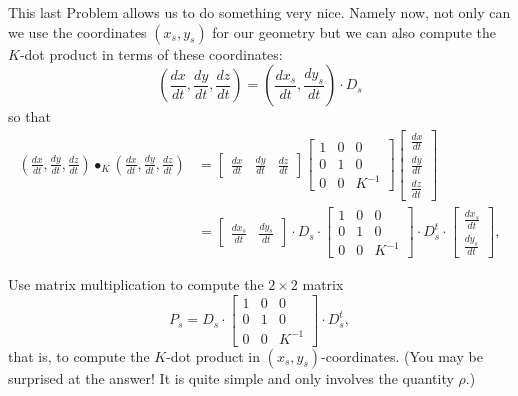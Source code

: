 \documentclass{ximera}
\begin{document}
This last Problem allows us to do something very nice. Namely now, not
only can we use the coordinates $\left( x_{s},y_{s}\right) $ for our
geometry but we can also compute the $K$-dot product in terms of these
coordinates:%
\[
\left(  \frac{dx}{dt},\frac{dy}{dt},\frac{dz}{dt}\right)  =\left(
\frac{dx_{s}}{dt},\frac{dy_{s}}{dt}\right)  \cdot D_{s}%
\]
so that%
\begin{align*}
\left(  \frac{dx}{dt},\frac{dy}{dt},\frac{dz}{dt}\right)  \bullet_{K}\left(
\frac{dx}{dt},\frac{dy}{dt},\frac{dz}{dt}\right)   &=
\begin{bmatrix}
\frac{dx}{dt} & \frac{dy}{dt} & \frac{dz}{dt}%
\end{bmatrix}
\begin{bmatrix}
1 & 0 & 0\\
0 & 1 & 0\\
0 & 0 & K^{-1}%
\end{bmatrix}
\begin{bmatrix}
\frac{dx}{dt}\\
\frac{dy}{dt}\\
\frac{dz}{dt}%
\end{bmatrix}\\
&=
\begin{bmatrix}
\frac{dx_{s}}{dt} & \frac{dy_{s}}{dt}%
\end{bmatrix}
\cdot D_{s}\cdot
\begin{bmatrix}
1 & 0 & 0\\
0 & 1 & 0\\
0 & 0 & K^{-1}%
\end{bmatrix}
\cdot D_{s}^{t}\cdot
\begin{bmatrix}
\frac{dx_{s}}{dt}\\
\frac{dy_{s}}{dt}%
\end{bmatrix},
\end{align*}


\begin{problem}
\label{36}Use matrix multiplication to compute the $2\times2$ matrix%
\[
P_{s}=D_{s}\cdot
\begin{bmatrix}
1 & 0 & 0\\
0 & 1 & 0\\
0 & 0 & K^{-1}%
\end{bmatrix}\cdot D_{s}^{t},
\]
that is, to compute the $K$-dot product in $\left( x_{s},y_{s}\right)
$-coordinates. (You may be surprised at the answer! It is quite simple
and only involves the quantity $\rho$.)
\end{problem}
\end{document}
